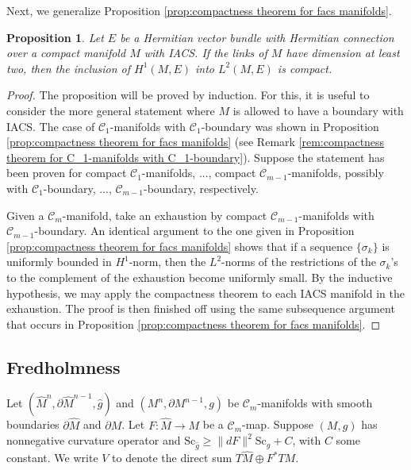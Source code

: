 \documentclass[12pt, reqno]{amsart}
\theoremstyle{plain} %
\newtheorem{proposition}[theorem]{Proposition}
\theoremstyle{definition}
\theoremstyle{remark}
\numberwithin{equation}{section}
\newcommand{\dom}[1]{\hat{#1}}
\newcommand{\norm}[1]{\lVert #1 \rVert}
\newcommand{\bnd}[1]{\partial #1}
\newcommand{\cat}[1]{\mathcal{#1}}
\newcommand{\Sc}{\mathrm{Sc}}
\begin{document}
Next, we generalize Proposition \ref{prop:compactness theorem for facs manifolds}.
\begin{proposition}\label{prop:compactness theorem for iacs manifolds}
    Let \(E\) be a Hermitian vector bundle with Hermitian connection over a compact manifold \(M\) with IACS.
    If the links of \(M\) have dimension at least two, then the inclusion of \(H^1(M, E)\) into \(L^2(M, E)\) is compact.
\end{proposition}
\begin{proof}
    The proposition will be proved by induction.
    For this, it is useful to consider the more general statement where \(M\) is allowed to have a boundary with IACS.
    The case of \(\cat{C}_1\)-manifolds with \(\cat{C}_1\)-boundary was shown in Proposition \ref{prop:compactness theorem for facs manifolds} (see Remark \ref{rem:compactness theorem for C_1-manifolds with C_1-boundary}).
    Suppose the statement has been proven for compact \(\cat{C}_1\)-manifolds, ..., compact \(\cat{C}_{m-1}\)-manifolds, possibly with \(\cat{C}_1\)-boundary, ..., \(\cat{C}_{m-1}\)-boundary, respectively.

    Given a \(\cat{C}_m\)-manifold, take an exhaustion by compact \(\cat{C}_{m-1}\)-manifolds with \(\cat{C}_{m-1}\)-boundary.
    An identical argument to the one given in Proposition \ref{prop:compactness theorem for facs manifolds} shows that if a sequence \(\{\sigma_k\}\) is uniformly bounded in \(H^1\)-norm, then the \(L^2\)-norms of the restrictions of the \(\sigma_k\)'s to the complement of the exhaustion become uniformly small.
    By the inductive hypothesis, we may apply the compactness theorem to each IACS manifold in the exhaustion.
    The proof is then finished off using the same subsequence argument that occurs in Proposition \ref{prop:compactness theorem for facs manifolds}.
\end{proof}

\subsection{Fredholmness}\label{subsec:fredholmness for iacs manifolds}
Let \((\dom{M}^n, \bnd{\dom{M}}^{n-1}, \dom{g})\) and \((M^n, \bnd{M}^{n-1},g)\) be \(\cat{C}_m\)-manifolds with smooth boundaries \(\bnd{\dom{M}}\) and \(\bnd{M}\).
Let \(F \colon \dom{M} \to M\) be a \(\cat{C}_m\)-map.
Suppose \((M,g)\) has nonnegative curvature operator and \(\Sc_{\dom{g}} \geq \norm{dF}^2 \Sc_g + C\), with \(C\) some constant.
We write \(V\) to denote the direct sum \(T\dom{M} \oplus F^*TM\).
\end{document}
